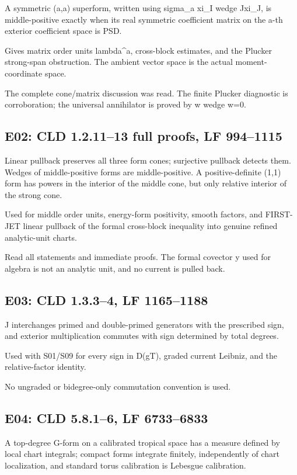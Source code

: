 \documentclass[11pt]{article}
\begin{document}
A symmetric (a,a) superform, written using sigma\_a xi\_I wedge Jxi\_J, is middle-positive exactly when its real symmetric coefficient matrix on the a-th exterior coefficient space is PSD.

Gives matrix order units lambda\textasciicircum{}a, cross-block estimates, and the Plucker strong-span obstruction. The ambient vector space is the actual moment-coordinate space.

The complete cone/matrix discussion was read. The finite Plucker diagnostic is corroboration; the universal annihilator is proved by w wedge w=0.

\subsection*{E02: CLD 1.2.11--13 full proofs, LF 994--1115}

Linear pullback preserves all three form cones; surjective pullback detects them. Wedges of middle-positive forms are middle-positive. A positive-definite (1,1) form has powers in the interior of the middle cone, but only relative interior of the strong cone.

Used for middle order units, energy-form positivity, smooth factors, and FIRST-JET linear pullback of the formal cross-block inequality into genuine refined analytic-unit charts.

Read all statements and immediate proofs. The formal covector y used for algebra is not an analytic unit, and no current is pulled back.

\subsection*{E03: CLD 1.3.3--4, LF 1165--1188}

J interchanges primed and double-primed generators with the prescribed sign, and exterior multiplication commutes with sign determined by total degrees.

Used with S01/S09 for every sign in D(gT), graded current Leibniz, and the relative-factor identity.

No ungraded or bidegree-only commutation convention is used.

\subsection*{E04: CLD 5.8.1--6, LF 6733--6833}

A top-degree G-form on a calibrated tropical space has a measure defined by local chart integrals; compact forms integrate finitely, independently of chart localization, and standard torus calibration is Lebesgue calibration.
\end{document}
